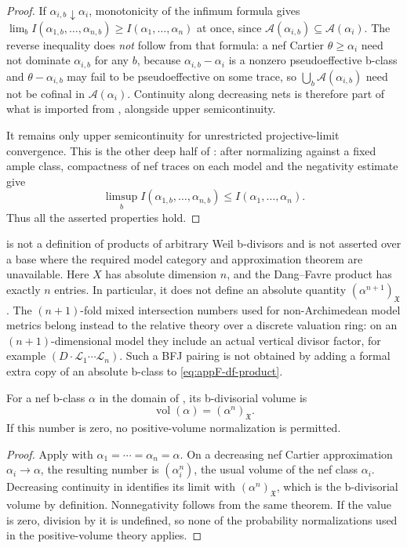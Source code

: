 \begin{proof}
If \(\alpha_{i,b}\downarrow\alpha_i\), monotonicity of the infimum formula
gives \(\lim_bI(\alpha_{1,b},\ldots,\alpha_{n,b})\geq
I(\alpha_1,\ldots,\alpha_n)\) at once, since
\(\mathcal A(\alpha_{i,b})\subseteq\mathcal A(\alpha_i)\).  The reverse
inequality does \emph{not} follow from that formula: a nef Cartier
\(\theta\geq\alpha_i\) need not dominate \(\alpha_{i,b}\) for any \(b\),
because \(\alpha_{i,b}-\alpha_i\) is a nonzero pseudoeffective b-class and
\(\theta-\alpha_{i,b}\) may fail to be pseudoeffective on some trace, so
\(\bigcup_b\mathcal A(\alpha_{i,b})\) need not be cofinal in
\(\mathcal A(\alpha_i)\).  Continuity along decreasing nets is therefore
part of what is imported from \cite[Theorem~3.2]{DF20}, alongside upper
semicontinuity.

It remains only upper semicontinuity for unrestricted
projective-limit convergence.  This is the other deep half of
\cite[Theorem~3.2]{DF20}: after normalizing against a fixed ample class,
compactness of nef traces on each model and the negativity estimate give
\[
 \limsup_b I(\alpha_{1,b},\ldots,\alpha_{n,b})
       \leq I(\alpha_1,\ldots,\alpha_n).
\]
Thus all the asserted properties hold.
\end{proof}

 is not a definition of products
of arbitrary Weil b-divisors and is not asserted over a base where the
required model category and approximation theorem are unavailable.
Here \(X\) has absolute dimension \(n\), and the Dang--Favre product has
exactly \(n\) entries.  In particular, it does not define an absolute
quantity \((\alpha^{n+1})_{\mathfrak X}\).  The \((n+1)\)-fold mixed
intersection numbers used for non-Archimedean model metrics belong instead
to the relative theory over a discrete valuation ring: on an
\((n+1)\)-dimensional model they include an actual vertical divisor factor,
for example \((D\cdot\mathcal L_1\cdots\mathcal L_n)\).  Such a BFJ
pairing is not obtained by adding a formal extra copy of an absolute
b-class to \eqref{eq:appF-df-product}.

\begin{corollary}\label{cor:appF-nef-volume}
For a nef b-class \(\alpha\) in the domain of
, its b-divisorial volume is
\[
                         \operatorname{vol}(\alpha)
                         =(\alpha^n)_{\mathfrak X}.
\tag{F.15}\label{eq:appF-nef-volume}
\]
If this number is zero, no positive-volume normalization is permitted.
\end{corollary}
\begin{proof}
Apply  with
\(\alpha_1=\cdots=\alpha_n=\alpha\).  On a decreasing nef Cartier approximation
\(\alpha_i\to\alpha\), the resulting number is
\((\alpha_i^n)\), the usual volume of the nef class \(\alpha_i\).  Decreasing
continuity in  identifies its limit with
\((\alpha^n)_{\mathfrak X}\), which is the b-divisorial volume by definition.
Nonnegativity follows from the same theorem.  If the value is zero, division
by it is undefined, so none of the probability normalizations used in the
positive-volume theory applies.
\end{proof}

